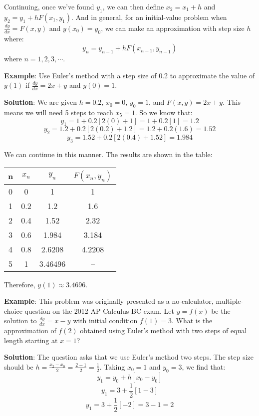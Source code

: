 Continuing, once we've found $y_1$, we can then define $x_2 = x_1 + h$ and 
$y_2 = y_1 + hF(x_1, y_1)$. And in general, for an initial-value problem when 
$\frac{dy}{dx} = F(x, y)$ and $y(x_0) = y_0$, we can make an approximation 
with step size $h$ where:
$$y_n = y_{n-1} + hF(x_{n-1},y_{n-1})$$
where $n = 1, 2, 3, \cdots$. 

\textbf{Example}: Use Euler's method with a step size of 0.2 to approximate 
the value of $y(1)$ if $\frac{dy}{dx} = 2x + y$ and $y(0) = 1$. 

\textbf{Solution}: We are given $h = 0.2$, $x_0 = 0$, $y_0 = 1$, and $F(x, y) 
= 2x + y$. This means we will need 5 steps to reach $x_{5} = 1$. So we know 
that:
$$y_1 = 1 + 0.2[2(0) + 1] = 1 + 0.2[1] = 1.2$$
$$y_2 = 1.2 + 0.2[2(0.2) + 1.2] = 1.2 + 0.2(1.6) = 1.52$$
$$y_3 = 1.52 + 0.2[2(0.4) + 1.52] = 1.984$$

We can continue in this manner. The results are shown in the table:
\begin{center}
\begin{tabular}{|c|c|c|c|}\hline
n & $x_n$ & $y_n$ & $F(x_n, y_n)$ \\\hline
0 & 0 & 1 & 1\\\hline
1 & 0.2 & 1.2 & 1.6\\\hline
2 & 0.4 & 1.52 & 2.32\\\hline
3 & 0.6 & 1.984 & 3.184\\\hline
4 & 0.8 & 2.6208 & 4.2208\\\hline
5 & 1 & 3.46496 & --\\\hline
\end{tabular}
\end{center}

Therefore, $y(1) \approx 3.4696$.

\textbf{Example}: This problem was originally presented as a no-calculator, 
multiple-choice question on the 2012 AP Calculus BC exam. Let $y = f(x)$ be 
the solution to $\frac{dy}{dx} = x - y$ with initial condition $f(1) = 3$. 
What is the approximation of $f(2)$ obtained using Euler's method with two 
steps of equal length starting at $x = 1$?

\textbf{Solution}: The question asks that we use Euler's method two steps. The 
step size should be $h = \frac{x_2 - x_0}{2} = \frac{2 - 1}{2} = \frac{1}{2}$. 
Taking $x_0 = 1$ and $y_0 = 3$, we find that:
$$y_1 = y_0 + h \left[x_0 - y_0 \right]$$
$$y_1 = 3 + \frac{1}{2} \left[1 - 3 \right]$$
$$y_1 = 3 + \frac{1}{2} \left[ -2 \right] = 3 - 1 = 2$$

